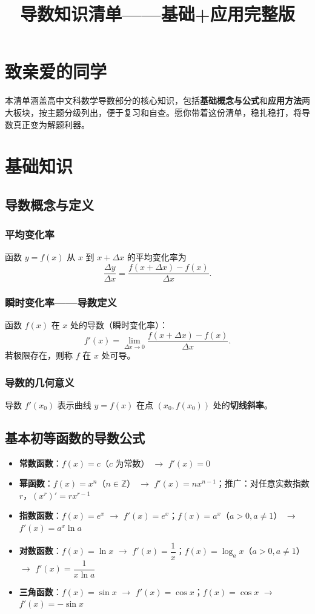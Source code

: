 \documentclass[10pt]{article}
\title{导数知识清单——基础+应用完整版}
\author{}
\date{}
\begin{document}
\maketitle

\section*{致亲爱的同学}
本清单涵盖高中文科数学导数部分的核心知识，包括\textbf{基础概念与公式}和\textbf{应用方法}两大板块，按主题分级列出，便于复习和自查。愿你带着这份清单，稳扎稳打，将导数真正变为解题利器。

\section{基础知识}
\subsection{导数概念与定义}
\subsubsection{平均变化率}
函数 $y=f(x)$ 从 $x$ 到 $x+\Delta x$ 的平均变化率为
$$\displaystyle \frac{\Delta y}{\Delta x}=\frac{f(x+\Delta x)-f(x)}{\Delta x}.$$

\subsubsection{瞬时变化率——导数定义}
函数 $f(x)$ 在 $x$ 处的导数（瞬时变化率）：
$$\displaystyle f'(x)=\lim_{\Delta x\to 0}\frac{f(x+\Delta x)-f(x)}{\Delta x}.$$
若极限存在，则称 $f$ 在 $x$ 处可导。

\subsubsection{导数的几何意义}
导数 $f'(x_0)$ 表示曲线 $y=f(x)$ 在点 $(x_0,f(x_0))$ 处的\textbf{切线斜率}。

\subsection{基本初等函数的导数公式}
\begin{itemize}
    \item \textbf{常数函数}：$f(x)=c$（$c$ 为常数） $\to$ $f'(x)=0$
    \item \textbf{幂函数}：$f(x)=x^n$（$n\in\mathbb{Z}$） $\to$ $f'(x)=n x^{n-1}$；推广：对任意实数指数 $r$，$(x^r)'=r x^{r-1}$
    \item \textbf{指数函数}：$f(x)=e^x$ $\to$ $f'(x)=e^x$；$f(x)=a^x$（$a>0,a\neq1$） $\to$ $f'(x)=a^x\ln a$
    \item \textbf{对数函数}：$f(x)=\ln x$ $\to$ $f'(x)=\dfrac{1}{x}$；$f(x)=\log_a x$（$a>0,a\neq1$） $\to$ $f'(x)=\dfrac{1}{x\ln a}$
    \item \textbf{三角函数}：$f(x)=\sin x$ $\to$ $f'(x)=\cos x$；$f(x)=\cos x$ $\to$ $f'(x)=-\sin x$
\end{itemize}
\end{document}
